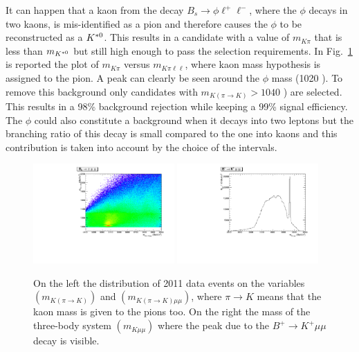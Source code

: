 It can happen that a kaon from the decay $B_s \rightarrow \phi \ell^+\ell^-$, where the $\phi$ decays in two kaons,
is mis-identified as a pion and therefore causes the $\phi$ to be reconstructed as a ${{K}^{*0}}$. This results in
a candidate with a value of $m_{K\pi}$ that is less than $m_{{{K}^{*0}}}$ but still high enough to
pass the selection requirements. In Fig.~\ref{fig:phiplots} is reported the plot of $m_{K\pi}$ versus
$m_{K\pi \ell\ell}$, where kaon mass hypothesis is assigned to the pion. A peak can clearly be seen
around the $\phi$ mass (1020 \mevcc).
To remove this background only candidates with $m_{K(\pi\rightarrow K)} > 1040$ \mevcc) are selected.
This results in a 98\% background rejection while keeping a 99\% signal efficiency.
The $\phi$ could also constitute a background when it decays into two leptons but the
branching ratio of this decay is small compared to the one into kaons and this
contribution is taken into account by the choice of the \qsq intervals.

\begin{center}
\begin{figure}[h!]
\centering 
\includegraphics[width=0.48\textwidth]{RKst/figs/RKst/phi.pdf}
\includegraphics[width=0.48\textwidth]{RKst/figs/RKst/Kmumu.pdf}
\caption{ On the left the distribution of 2011 data events on the variables $(m_{K(\pi\rightarrow K)})$ 
and $(m_{K(\pi\rightarrow K)\mu\mu})$, where $\pi\rightarrow K$ means that the kaon mass is given 
to the pions too. On the right the mass of the three-body system $(m_{K\mu\mu})$
where the peak due to the $B^+ \rightarrow K^+ \mu\mu$ decay is visible. }
\label{fig:phiplots}
\end{figure}
\end{center}


